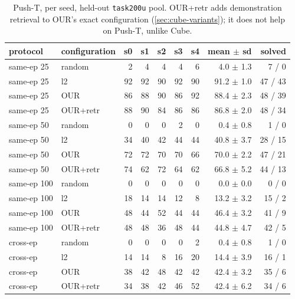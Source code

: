 \documentclass[11pt]{article}
\begin{document}
\begin{table}[H]
\centering\small
\caption{Push-T, per seed, held-out \texttt{task200u} pool. OUR+retr adds demonstration
retrieval to OUR's exact configuration (\cref{sec:cube-variants}); it does not help on
Push-T, unlike Cube.}
\begin{tabular}{llrrrrrrr}
\toprule
protocol & configuration & s0 & s1 & s2 & s3 & s4 & mean $\pm$ sd & solved \\
\midrule
same-ep 25 & random & 2 & 4 & 4 & 4 & 6 & 4.0 $\pm$ 1.3 & 7 / 0 \\
same-ep 25 & l2 & 92 & 92 & 90 & 92 & 90 & 91.2 $\pm$ 1.0 & 47 / 43 \\
same-ep 25 & OUR & 86 & 88 & 90 & 86 & 92 & 88.4 $\pm$ 2.3 & 48 / 39 \\
same-ep 25 & OUR+retr & 88 & 90 & 84 & 86 & 86 & 86.8 $\pm$ 2.0 & 48 / 34 \\
\midrule
same-ep 50 & random & 0 & 0 & 0 & 2 & 0 & 0.4 $\pm$ 0.8 & 1 / 0 \\
same-ep 50 & l2 & 34 & 40 & 42 & 44 & 44 & 40.8 $\pm$ 3.7 & 28 / 15 \\
same-ep 50 & OUR & 72 & 72 & 70 & 70 & 66 & 70.0 $\pm$ 2.2 & 47 / 21 \\
same-ep 50 & OUR+retr & 74 & 62 & 72 & 64 & 62 & 66.8 $\pm$ 5.2 & 44 / 13 \\
\midrule
same-ep 100 & random & 0 & 0 & 0 & 0 & 0 & 0.0 $\pm$ 0.0 & 0 / 0 \\
same-ep 100 & l2 & 18 & 14 & 14 & 12 & 8 & 13.2 $\pm$ 3.2 & 15 / 2 \\
same-ep 100 & OUR & 48 & 44 & 52 & 44 & 44 & 46.4 $\pm$ 3.2 & 41 / 9 \\
same-ep 100 & OUR+retr & 48 & 48 & 36 & 48 & 44 & 44.8 $\pm$ 4.7 & 42 / 5 \\
\midrule
cross-ep & random & 0 & 0 & 0 & 0 & 2 & 0.4 $\pm$ 0.8 & 1 / 0 \\
cross-ep & l2 & 14 & 14 & 8 & 16 & 20 & 14.4 $\pm$ 3.9 & 16 / 1 \\
cross-ep & OUR & 38 & 42 & 48 & 42 & 42 & 42.4 $\pm$ 3.2 & 35 / 6 \\
cross-ep & OUR+retr & 34 & 38 & 42 & 46 & 52 & 42.4 $\pm$ 6.2 & 34 / 6 \\
\bottomrule
\end{tabular}
\end{table}
\end{document}
